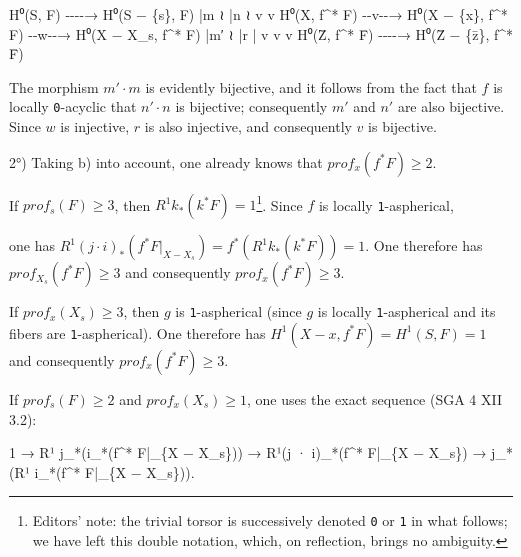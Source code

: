 \documentclass[
  11pt,
  a4paper,
]{book}
\newenvironment{Shaded}{}{}
\newcommand{\NormalTok}[1]{#1}
\begin{document}
\begin{Shaded}
\begin{Highlighting}[]
\NormalTok{H⁰(S, F) {-}{-}{-}{-}→ H⁰(S − \{s\}, F)}
\NormalTok{   |m ≀                |n ≀}
\NormalTok{   v                    v}
\NormalTok{H⁰(X, f\^{}* F) {-}{-}v{-}{-}→ H⁰(X − \{x\}, f\^{}* F) {-}{-}w{-}{-}→ H⁰(X − X\_s, f\^{}* F)}
\NormalTok{   |m′ ≀                |r                       |}
\NormalTok{   v                    v                        v}
\NormalTok{H⁰(Z̄, f\^{}* F̄) {-}{-}{-}{-}→  H⁰(Z̄ − \{z̄\}, f\^{}* F̄)}
\end{Highlighting}
\end{Shaded}

The morphism \(m' \cdot m\) is evidently bijective, and it follows from
the fact that \(f\) is locally \texttt{0}-acyclic that \(n'
\cdot n\) is bijective; consequently \(m'\) and \(n'\) are also
bijective. Since \(w\) is injective, \(r\) is also injective, and
consequently \(v\) is bijective.

2°) Taking b) into account, one already knows that
\(prof_{x}(f^{*} F) \geqslant 2\).

If \(prof_{s}(F) \geqslant 3\), then
\(R^{1} k_{*}(k^{*} F) = 1\)\footnote{Editors' note: the trivial torsor
  is successively denoted \texttt{0} or \texttt{1} in what follows; we
  have left this double notation, which, on reflection, brings no
  ambiguity.}. Since \(f\) is locally \texttt{1}-aspherical,

one has
\(R^{1}(j \cdot i)_{*}(f^{*} F|_{X - X_{s}}) = f^{*}(R^{1} k_{*}(k^{*} F)) = 1\).
One therefore has \(prof_{X_{s}}(f^{*} F) \geqslant 3\) and consequently
\(prof_{x}(f^{*} F) \geqslant 3\).

If \(prof_{x}(X_{s}) \geqslant 3\), then \(g\) is \texttt{1}-aspherical
(since \(g\) is locally \texttt{1}-aspherical and its fibers are
\texttt{1}-aspherical). One therefore has
\(H^{1}(X - {x}, f^{*} F) = H^{1}(S, F) = 1\) and consequently
\(prof_{x}(f^{*} F)
\geqslant 3\).

If \(prof_{s}(F) \geqslant 2\) and \(prof_{x}(X_{s}) \geqslant 1\), one
uses the exact sequence (SGA 4 XII 3.2):

\begin{Shaded}
\begin{Highlighting}[]
\NormalTok{1 → R¹ j\_*(i\_*(f\^{}* F|\_\{X − X\_s\})) → R¹(j · i)\_*(f\^{}* F|\_\{X − X\_s\}) → j\_*(R¹ i\_*(f\^{}* F|\_\{X − X\_s\})).}
\end{Highlighting}
\end{Shaded}
\end{document}
